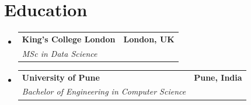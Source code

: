 \documentclass[a4paper,10pt]{article}
\makeatletter
\newcommand{\resumeSubheading}[4]{
  \vspace{-3pt}\item
    \begin{tabular*}{1.0\textwidth}[t]{l@{\extracolsep{\fill}}r}
      \textbf{\color{accent}#1} & \textbf{\small\color{muted}#2} \\
      \textit{\small#3} & \textit{\small\color{muted}#4} \\
    \end{tabular*}\vspace{-7pt}
}
\newcommand{\resumeSubHeadingListStart}{\begin{itemize}[leftmargin=0.0in, label={}]}
\newcommand{\resumeSubHeadingListEnd}{\end{itemize}}
\makeatother
\begin{document}
\section{Education}
  \resumeSubHeadingListStart
    \resumeSubheading
      {King's College London}{London, UK}
      {MSc in Data Science}{}

    \resumeSubheading
      {University of Pune}{Pune, India}
      {Bachelor of Engineering in Computer Science}{}
  \resumeSubHeadingListEnd

\end{document}
